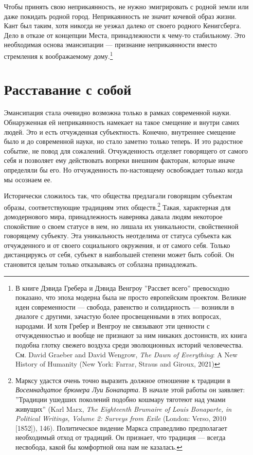 \documentclass[12pt]{book}
\begin{document}
Чтобы принять свою неприкаянность, не нужно эмигрировать с родной земли или даже покидать родной город. Неприкаянность не значит кочевой образ жизни. Кант был таким, хотя никогда не уезжал далеко от своего родного Кенигсберга. Дело в отказе от концепции Места, принадлежности к чему-то стабильному. Это необходимая основа эмансипации --- признание неприкаянности вместо стремления к воображаемому дому.\footnote{В книге Дэвида Гребера и Дэвида Венгроу ''Рассвет всего'' превосходно показано, что эпоха модерна была не просто европейским проектом. Великие идеи современности --- свобода, равенство и солидарность --- возникли в диалоге с другими, зачастую более просвещенными в этих вопросах, народами. И хотя Гребер и Венгроу не связывают эти ценности с отчужденностью и вообще не признают за ним никаких достоинств, их книга подобна глотку свежего воздуха среди эволюционных историй человечества. См. David Graeber and David Wengrow, \textit{The Dawn of Everything}: A New History of Humanity (New York: Farrar, Straus and Giroux, 2021)}

\section{Расставание с собой}

Эмансипация стала очевидно возможна только в рамках современной науки. Обнаруженная ей неприкаянность намекает на такое смещение и внутри самих людей. Это и есть отчужденная субъектность. Конечно, внутреннее смещение было и до современной науки, но стало заметно только теперь. И это радостное событие, не повод для сожалений. Отчужденность отделяет говорящего от самого себя и позволяет ему действовать вопреки внешним факторам, которые иначе определяли бы его. Но отчужденность по-настоящему освобождает только когда мы осознаем ее.

Исторически сложилось так, что общества предлагали говорящим субъектам образы, соответствующие традициям этих обществ.\footnote{Марксу удастся очень точно выразить должное отношение к традиции в \textit{Восемнадцатое брюмера Луи Бонапарта}. В начале этой работы он заявляет: ''Традиции ушедших поколений подобно кошмару тяготеют над умами живущих'' (Karl Marx, \textit{The Eighteenth Brumaire of Louis Bonaparte, in Political Writings, Volume 2: Surveys from Exile} (London: Verso, 2010 [1852]), 146). Политическое видение Маркса справедливо предполагает необходимый отход от традиций. Он признает, что традиция --- всегда несвобода, какой бы комфортной она нам не казалась.} Такая, характерная для домодернового мира, принадлежность наверняка давала людям некоторое спокойствие о своем статусе в нем, но лишала их уникальности, свойственной говорящему субъекту. Эта уникальность неотделима от статуса субъекта как отчужденного и от своего социального окружения, и от самого себя. Только дистанцируясь от себя, субъект в наибольшей степени может быть собой. Он становится целым только отказываясь от соблазна принадлежать. 
\end{document}

